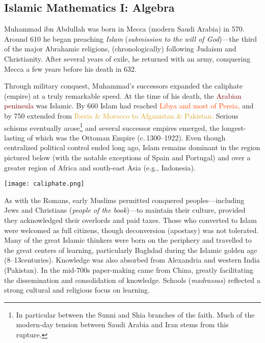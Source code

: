 \clearpage


\subsection{Islamic Mathematics I: Algebra}\label{sec:islamalgebra}

Muhammad ibn Abdullah was born in Mecca (modern Saudi Arabia) in 570. Around 610 he began preaching \emph{Islam} (\emph{submission to the will of God})---the third of the major Abrahamic religions, (chronologically) following Judaism and Christianity. After several years of exile, he returned with an army, conquering Mecca a few years before his death in 632.\smallbreak

Through military conquest, Muhammad's successors expanded the caliphate (empire) at a truly remarkable speed. At the time of his death, the \textcolor{Maroon}{Arabian peninsula} was Islamic. By 660 Islam had reached \textcolor{OrangeRed}{Libya and most of Persia,} and by 750 extended from \textcolor{Goldenrod}{Iberia \& Morocco to Afganistan \& Pakistan.} Serious schisms eventually arose\footnote{%
	In particular between the Sunni and Shia branches of the faith. Much of the modern-day tension between Saudi Arabia and Iran stems from this rupture.%
} and several successor empires emerged, the longest-lasting of which was the Ottoman Empire (c.\,1300--1922). Even though centralized political control ended long ago, Islam remains dominant in the region pictured below (with the notable exceptions of Spain and Portugal) and over a greater region of Africa and south-east Asia (e.g., Indonesia).
\begin{center}
	\texttt{[image: caliphate.png]}
\end{center}

As with the Romans, early Muslims permitted conquered peoples---including Jews and Christians (\emph{people of the book})---to maintain their culture, provided they acknowledged their overlords and paid taxes. Those who converted to Islam were welcomed as full citizens, though deconversion (apostasy) was not tolerated. Many of the great Islamic thinkers were born on the periphery and travelled to the great centers of learning, particularly Baghdad during the Islamic golden age (8\th--13\th centuries). Knowledge was also absorbed from Alexandria and western India (Pakistan). In the mid-700s paper-making came from China, greatly facilitating the dissemination and consolidation of knowledge. Schools (\emph{madrassas}) reflected a strong cultural and religious focus on learning.\smallbreak

